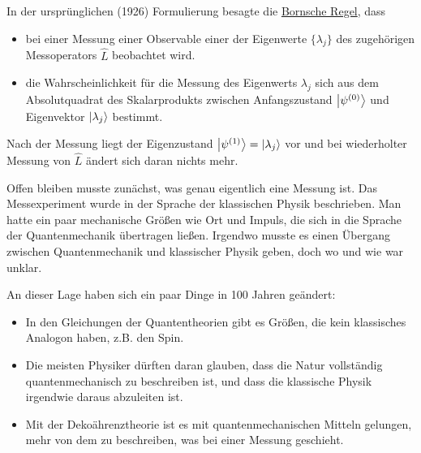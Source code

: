 \documentclass[12pt]{article}
\begin{document}
In der ursprünglichen (1926) Formulierung besagte die \href{https://en.wikipedia.org/wiki/Born_rule}{Bornsche Regel}, dass 
\begin{itemize}
\item bei einer Messung einer Observable einer der Eigenwerte $\{\lambda_j\}$ des zugehörigen Messoperators $\hat{L}$ beobachtet wird.
\item die Wahrscheinlichkeit für die Messung des Eigenwerts $\lambda_j$ sich aus dem Absolutquadrat des Skalarprodukts zwischen Anfangszustand $\ket{\psi^{(0)}}$ und Eigenvektor $\ket{\lambda_j}$ bestimmt.
\end{itemize}
Nach der Messung liegt der Eigenzustand $\ket{\psi^{(1)}} = \ket{\lambda_j}$ vor und bei wiederholter Messung von $\hat{L}$ ändert sich daran nichts mehr. 

Offen bleiben musste zunächst, was genau eigentlich eine Messung ist. Das Messexperiment wurde in der Sprache der klassischen Physik beschrieben. Man hatte ein paar mechanische Größen wie Ort und Impuls, die sich in die Sprache der Quantenmechanik übertragen ließen. Irgendwo musste es einen Übergang zwischen Quantenmechanik und klassischer Physik geben, doch wo und wie war unklar.

An dieser Lage haben sich ein paar Dinge in 100 Jahren geändert:
\begin{itemize}
\item In den Gleichungen der Quantentheorien gibt es Größen, die kein klassisches Analogon haben, z.B. den Spin. 
\item Die meisten Physiker dürften daran glauben, dass die Natur vollständig quantenmechanisch zu beschreiben ist, und dass die klassische Physik irgendwie daraus abzuleiten ist.
\item Mit der Dekoährenztheorie ist es mit quantenmechanischen Mitteln gelungen, mehr von dem zu beschreiben, was bei einer Messung geschieht.
\end{itemize}
\end{document}
